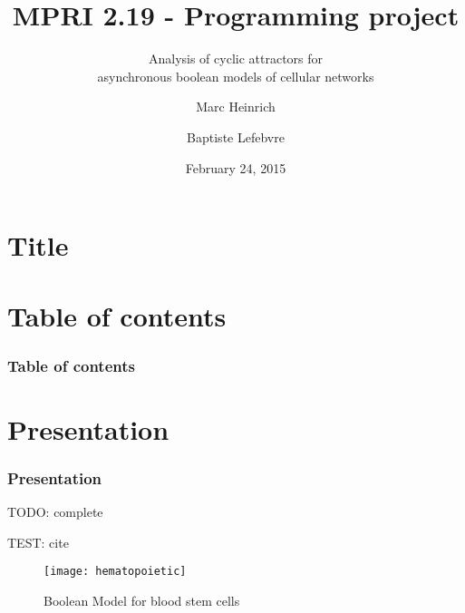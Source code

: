 \documentclass{beamer}
\title{MPRI 2.19 - Programming project}
\subtitle{Analysis of cyclic attractors for \\ asynchronous boolean models of cellular networks}
\author{Marc Heinrich \and Baptiste Lefebvre}
\institute{École Normale Supérieure, Computer Science Department}
\date{February 24, 2015}
\begin{document}
\section*{Title}

\begin{frame}
  \titlepage
\end{frame}


\section*{Table of contents}

\begin{frame}
  \frametitle{Table of contents}
  \tableofcontents
\end{frame} 



\section{Presentation}

\begin{frame}
  \frametitle{Presentation}    
  TODO: complete
  
  TEST: cite \cite{Bonzanni}
\end{frame}

\begin{frame}
\begin{figure}
\texttt{[image: hematopoietic]}
\caption{Boolean Model for blood stem cells}
\end{figure}

\end{frame}
\end{document}

